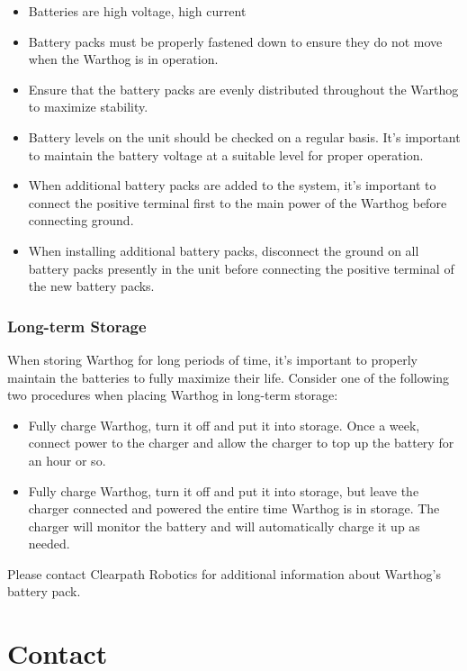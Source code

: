 \documentclass[]{clearpath-latex/clearpath-manual}
\begin{document}
\begin{itemize}[nolistsep]
  \item Batteries are high voltage, high current
  \item Battery packs must be properly fastened down to ensure they do not move when the Warthog is in operation.
  \item Ensure that the battery packs are evenly distributed throughout the Warthog to maximize stability.
  \item Battery levels on the unit should be checked on a regular basis.  It's important to maintain the battery voltage at a suitable level for proper operation.
  \item When additional battery packs are added to the system, it's important to connect the positive terminal first to the main power of the Warthog before connecting ground.
  \item When installing additional battery packs, disconnect the ground on all battery packs presently in the unit before connecting the positive terminal of the new battery packs.
\end{itemize}

\subsubsection{Long-term Storage}

When storing Warthog for long periods of time, it's important to properly maintain the batteries to fully maximize their life.  Consider one of the following two procedures when placing Warthog in long-term storage:

\begin{itemize}[nolistsep]
  \item Fully charge Warthog, turn it off and put it into storage.  Once a week, connect power to the charger and allow the charger to top up the battery for an hour or so.
  \item Fully charge Warthog, turn it off and put it into storage, but leave the charger connected and powered the entire time Warthog is in storage.  The charger will monitor the battery and will automatically charge it up as needed.
\end{itemize}


Please contact Clearpath Robotics for additional information about Warthog's battery pack.


\section{Contact}
\label{contact}
\end{document}
